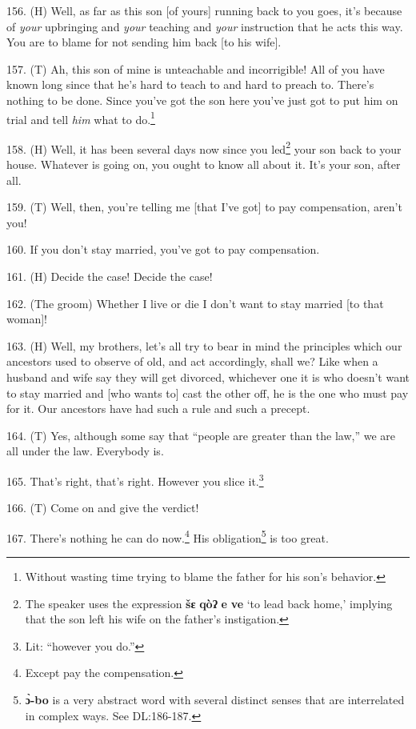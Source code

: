 156. (H)  Well, as far as
this son [of yours] running back to you goes, it's because of \textit{your} upbringing
and \textit{your} teaching and \textit{your} instruction that he acts this way.
You are to blame for not sending him back [to his wife].

157. (T)  Ah, this son of mine
is unteachable and incorrigible! All of you have known long since that he's hard
to teach to and hard to preach to. There's nothing to be done. Since you've got
the son here you've just got to put him on trial and tell \textit{him}
what to do.\footnote{Without wasting time trying to blame the father for his son's behavior.}

158. (H) Well, it has been several days now since you led\footnote{The speaker uses the expression \textbf{šɛ} \textbf{qòʔ} \textbf{e} \textbf{ve} `to lead back home,' implying that the son left his wife on the father's instigation.} your son back to
your house. Whatever is going on, you ought to know all about it. It's your son,
after all.

159. (T) Well, then, you're telling me [that I've got] to pay compensation, aren't
you!

160. If you don't stay married, you've got to pay compensation.

161. (H) Decide the case! Decide the case!

162. (The groom) Whether I live or die I don't want to stay married [to that woman]!

163. (H) Well, my brothers, let's all try to bear in mind the principles which
our ancestors used to observe of old, and act accordingly, shall we? Like when
a husband and wife say they will get divorced, whichever one it is who doesn't
want to stay married and [who wants to] cast the other off, he is the one who must
pay for it. Our ancestors have had such a rule and such a precept.

164. (T) Yes, although some say that ``people are greater than the law,''
we are all under the law. Everybody is.

165. That's right, that's right. However you slice it.\footnote{Lit: ``however you do.''}

166. (T) Come on and give the verdict!

167. There's nothing he can do now.\footnote{Except pay the compensation.} His obligation\footnote{\textbf{ɔ̀-bo} is a very abstract word with several distinct senses that are interrelated in complex ways. See DL:186-187.} is too great.

